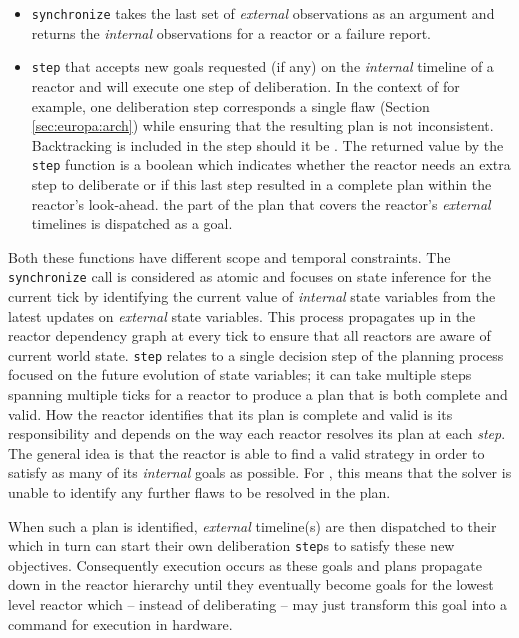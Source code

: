 \begin{itemize}

\item \texttt{synchronize} takes the last set of {\em external}
  observations as an argument and returns the {\em internal}
  observations for a reactor or a failure report.

\item \texttt{step} that accepts new goals requested (if any) on the
  {\em internal} timeline of a reactor and will execute one step of
  deliberation. In the context of \eu for example, one deliberation
  step corresponds  a single flaw
  (Section \ref{sec:europa:arch}) while ensuring that the resulting
  plan is not inconsistent. Backtracking is included in the step
  should it be .  The returned value by the
  \texttt{step} function is a boolean which indicates whether the
  reactor needs an extra step to deliberate or if this last step
  resulted in a complete plan within the reactor's
  look-ahead.  the part of the plan that covers
  the reactor's {\em external} timelines is dispatched as a goal.

\end{itemize}

Both these functions have different scope and temporal constraints.
The \texttt{synchronize} call is considered as atomic and focuses on
state inference for the current tick by identifying the current value
of {\em internal} state variables from the latest updates on {\em
  external} state variables. This process propagates up in the reactor
dependency graph at every tick to ensure that all reactors are aware
of current world state. \texttt{step} relates to a single decision
step of the planning process focused on the future evolution of state
variables; it can take multiple steps spanning multiple ticks for a
reactor to produce a plan that is both complete and valid. How the
reactor identifies that its plan is complete and valid is its
responsibility and depends on the way each reactor resolves its plan
at each {\em step}. The general idea is that the reactor is able to
find a valid strategy in order to satisfy as many of its {\em
  internal} goals as possible. For \eue, this means that the solver is
unable to identify any further flaws to be resolved in the
plan. 

When such a plan is identified,  {\em external}
timeline(s) are then dispatched to their  which in turn can start their own deliberation
\texttt{step}s to satisfy these new objectives. Consequently execution
occurs as these goals and plans propagate down in the reactor
hierarchy until they eventually become goals for the lowest level
reactor which -- instead of deliberating -- may just transform this
goal into a command for execution in hardware.

